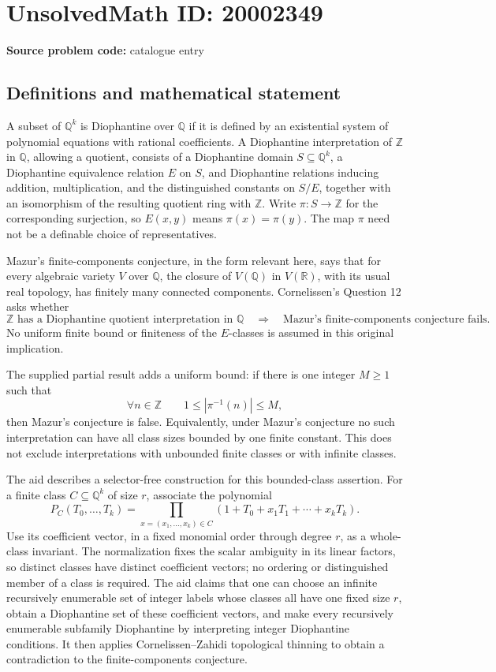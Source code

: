 \documentclass[11pt]{article}
\newcommand{\Z}{\mathbb{Z}}
\newcommand{\Q}{\mathbb{Q}}
\newcommand{\R}{\mathbb{R}}
\begin{document}
\section*{UnsolvedMath ID: 20002349}
\textbf{Source problem code:} catalogue entry
\subsection{Definitions and mathematical statement}
A subset of \(\Q^k\) is Diophantine over \(\Q\) if it is defined by an existential system of polynomial equations with rational coefficients. A Diophantine interpretation of \(\Z\) in \(\Q\), allowing a quotient, consists of a Diophantine domain \(S\subseteq\Q^k\), a Diophantine equivalence relation \(E\) on \(S\), and Diophantine relations inducing addition, multiplication, and the distinguished constants on \(S/E\), together with an isomorphism of the resulting quotient ring with \(\Z\). Write \(\pi:S\to\Z\) for the corresponding surjection, so \(E(x,y)\) means \(\pi(x)=\pi(y)\). The map \(\pi\) need not be a definable choice of representatives.

Mazur's finite-components conjecture, in the form relevant here, says that for every algebraic variety \(V\) over \(\Q\), the closure of \(V(\Q)\) in \(V(\R)\), with its usual real topology, has finitely many connected components. Cornelissen's Question 12 asks whether
\[
 \Z\text{ has a Diophantine quotient interpretation in }\Q
 \quad\Longrightarrow\quad
 \text{Mazur's finite-components conjecture fails}.
\]
No uniform finite bound or finiteness of the \(E\)-classes is assumed in this original implication.

The supplied partial result adds a uniform bound: if there is one integer \(M\ge1\) such that
\[
 \forall n\in\Z\qquad 1\le|\pi^{-1}(n)|\le M,
\]
then Mazur's conjecture is false. Equivalently, under Mazur's conjecture no such interpretation can have all class sizes bounded by one finite constant. This does not exclude interpretations with unbounded finite classes or with infinite classes.

The aid describes a selector-free construction for this bounded-class assertion. For a finite class \(C\subseteq\Q^k\) of size \(r\), associate the polynomial
\[
 P_C(T_0,\ldots,T_k)
 =\prod_{x=(x_1,\ldots,x_k)\in C}
 (1+T_0+x_1T_1+\cdots+x_kT_k).
\]
Use its coefficient vector, in a fixed monomial order through degree \(r\), as a whole-class invariant. The normalization fixes the scalar ambiguity in its linear factors, so distinct classes have distinct coefficient vectors; no ordering or distinguished member of a class is required. The aid claims that one can choose an infinite recursively enumerable set of integer labels whose classes all have one fixed size \(r\), obtain a Diophantine set of these coefficient vectors, and make every recursively enumerable subfamily Diophantine by interpreting integer Diophantine conditions. It then applies Cornelissen--Zahidi topological thinning to obtain a contradiction to the finite-components conjecture.
\end{document}
